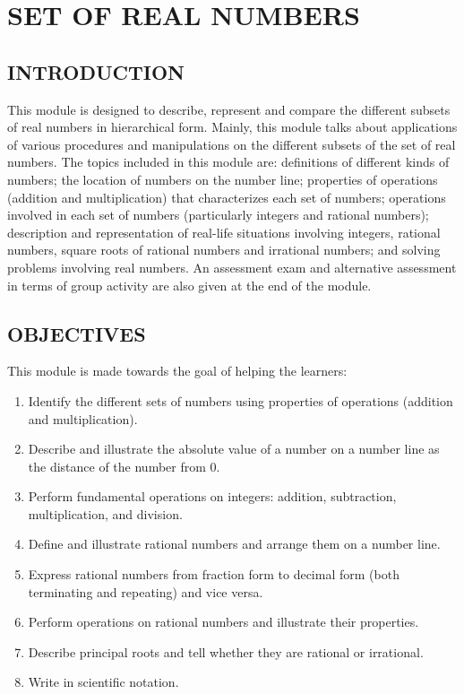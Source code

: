 \chapter{SET OF REAL NUMBERS}\label{chap:2}
\section*{INTRODUCTION}
This module is designed to describe, represent and compare the different subsets of real
numbers in hierarchical form. Mainly, this module talks about applications of various procedures and
manipulations on the different subsets of the set of real numbers. The topics included in this module
are: definitions of different kinds of numbers; the location of numbers on the number line;
properties of operations (addition and multiplication) that characterizes each set of numbers;
operations involved in each set of numbers (particularly integers and rational numbers); description
and representation of real-life situations involving integers, rational numbers, square roots of
rational numbers and irrational numbers; and solving problems involving real numbers. An
assessment exam and alternative assessment in terms of group activity are also given at the end of
the module.

\section*{OBJECTIVES}
This module is made towards the goal of helping the learners:
\begin{enumerate}
\item Identify the different sets of numbers using properties of operations (addition and
multiplication).
\item Describe and illustrate the absolute value of a number on a number line as the distance of
the number from 0.
\item Perform fundamental operations on integers: addition, subtraction, multiplication, and
division.
\item Define and illustrate rational numbers and arrange them on a number line.
\item Express rational numbers from fraction form to decimal form (both terminating and
repeating) and vice versa.
\item Perform operations on rational numbers and illustrate their properties.
\item Describe principal roots and tell whether they are rational or irrational.
\item Write in scientific notation.
\end{enumerate}

